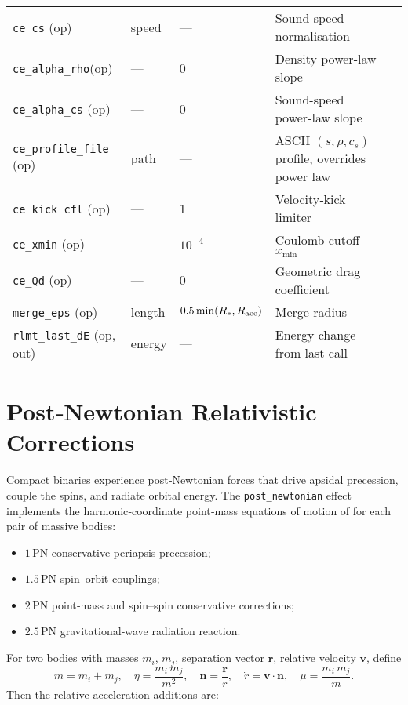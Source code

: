 \documentclass[11pt]{article}
\begin{document}
\begin{table}[h]
\begin{tabular}{@{}lllll@{}}
\texttt{ce\_cs}         (op) & speed   & — & Sound-speed normalisation\\
\texttt{ce\_alpha\_rho}(op) & —       & 0 & Density power-law slope\\
\texttt{ce\_alpha\_cs} (op) & —       & 0 & Sound-speed power-law slope\\
\texttt{ce\_profile\_file}  (op) & path & — & ASCII $(s,\rho,c_s)$ profile, overrides power law\\
\texttt{ce\_kick\_cfl}      (op) & — & 1 & Velocity‑kick limiter\\
\texttt{ce\_xmin}           (op) & — & $10^{-4}$ & Coulomb cutoff $x_{\min}$\\
\texttt{ce\_Qd}             (op) & — & 0 & Geometric drag coefficient\\[0.2em]
\texttt{merge\_eps}         (op) & length & $0.5\min(R_*,R_{\rm acc})$ & Merge radius\\
\texttt{rlmt\_last\_dE}    (op, out) & energy & — & Energy change from last call\\
\bottomrule
\end{tabular}
\end{table}

\section{Post‐Newtonian Relativistic Corrections}

Compact binaries experience post‐Newtonian forces that drive apsidal
precession, couple the spins, and radiate orbital energy.  The
\texttt{post\_newtonian} effect implements the harmonic‐coordinate
point‐mass equations of motion of \citet{Kidder1995} for each pair of
massive bodies:
\begin{itemize}[nosep,leftmargin=1.8em]
  \item $1$\,PN conservative periapsis‐precession;
  \item $1.5$\,PN spin–orbit couplings;
  \item $2$\,PN point‐mass and spin–spin conservative corrections;
  \item $2.5$\,PN gravitational‐wave radiation reaction.
\end{itemize}

\medskip
\noindent
For two bodies with masses $m_i$, $m_j$, separation vector $\mathbf{r}$,
relative velocity $\mathbf{v}$, define
\[
  m = m_i + m_j,\quad
  \eta = \frac{m_i\,m_j}{m^2},\quad
  \mathbf{n} = \frac{\mathbf{r}}{r},\quad
  \dot r = \mathbf{v}\cdot\mathbf{n},\quad
  \mu = \frac{m_i\,m_j}{m}.
\]
Then the relative acceleration additions are:
\end{document}
